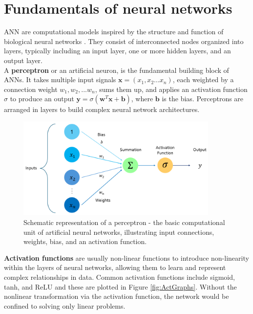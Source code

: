 \section{Fundamentals of neural networks}
\gls{ANN} are computational models inspired by the structure and function of biological neural networks \cite{rumel}. They consist of interconnected nodes organized into layers, typically including an input layer, one or more hidden layers, and an output layer. \\ 
A \textbf{perceptron} or an artificial neuron, is the fundamental building block of ANNs. It takes multiple input signals $\mathbf{x}= \left(x_1, x_2 ...x_n\right)$, each weighted by a connection weight $w_1,w_2,...w_n$, sums them up, and applies an activation function $\sigma$ to produce an output $\mathbf{y} = \sigma \left(\mathbf{w}^T\mathbf{x} + \mathbf{b} \right)$, where $\mathbf{b}$ is the bias. Perceptrons are arranged in layers to build complex neural network architectures.\\
\begin{figure}[ht]
    \centering
    \includegraphics[width=10cm]{images/Theory-DL/ActFn.png}
    \caption{Schematic representation of a perceptron - the basic computational unit of artificial neural networks, illustrating input connections, weights, bias, and an activation function.}
    \label{fig:Perceptron}
  \end{figure}
\textbf{Activation functions} are usually non-linear functions to introduce non-linearity within the layers of neural networks, allowing them to learn and represent complex relationships in data. Common activation functions include sigmoid, tanh, and \gls{ReLU} and these are plotted in Figure \ref{fig:ActGraphs}. Without the nonlinear transformation via the activation function, the network would be confined to solving only linear problems. \\
